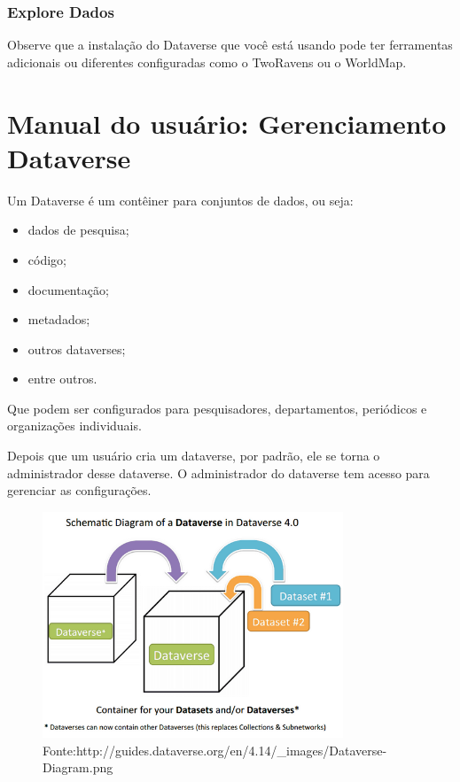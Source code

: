 \documentclass[12pt,hidelinks]{article}
\begin{document}
    	\subsubsection{Explore Dados}
	
\qquad Observe que a instalação do Dataverse que você está usando pode ter ferramentas adicionais ou diferentes configuradas como o TwoRavens ou o WorldMap.
	
\newpage

\section{Manual do usuário: Gerenciamento Dataverse}
\vspace{10.5cm}

\qquad Um Dataverse é um contêiner para conjuntos de dados, ou seja: 

\begin{itemize}
    \item dados de pesquisa;
    \item código;
    \item documentação;
    \item metadados;
    \item outros dataverses;
    \item entre outros.
\end{itemize}

Que podem ser configurados para pesquisadores, departamentos, periódicos e organizações individuais.

Depois que um usuário cria um dataverse, por padrão, ele se torna o administrador desse dataverse. O administrador do dataverse tem acesso para gerenciar as configurações.

\newpage

\begin{figure}
\centering
    \includegraphics[width=0.80\textwidth]{Dataverse-Diagram.png}
    \caption{Fonte:http://guides.dataverse.org/en/4.14/\_images/Dataverse-Diagram.png}
    \label{Diagrama dataverse}
\end{figure}
\end{document}

